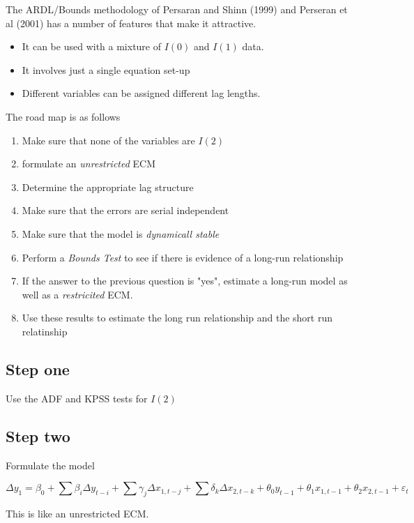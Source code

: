 \documentclass[12pt, a4paper, oneside]{article}\usepackage[]{graphicx}\usepackage[]{color}
\begin{document}
The ARDL/Bounds methodology of Persaran and Shinn (1999) and Perseran et al (2001) has a number of features that make it attractive.

\begin{itemize}
\item It can be used with a mixture of $I(0)$ and $I(1)$ data.  
\item It involves just a single equation set-up
\item Different variables can be assigned different lag lengths.
\end{itemize}

The road map is as follows 
\begin{enumerate}
\item Make sure that none of the variables are $I(2)$
\item formulate an \emph{unrestricted} ECM
\item Determine the appropriate lag structure
\item Make sure that the errors are serial independent
\item Make sure that the model is \emph{dynamicall stable}
\item Perform a \emph{Bounds Test} to see if there is evidence of a long-run relationship
\item If the answer to the previous question is "yes", estimate a long-run model as well as a \emph{restricited} ECM. 
\item Use these results to estimate the long run relationship and the short run relatinship
\end{enumerate}

\subsection*{Step one}
Use the ADF and KPSS tests for $I(2)$

\subsection*{Step two}
Formulate the model

\begin{equation}
\Delta y_1 = \beta_0 + \sum \beta_i \Delta y_{t-i} + \sum \gamma_j \Delta x_{1, t-j} + \sum \delta_k \Delta x_{2, t-k} + \theta_0 y_{t-1} + \theta_1 x_{1, t-1} + \theta_2 x_{2, t-1} + \varepsilon_t
\end{equation}

This is like an unrestricted ECM. 
\end{document}

